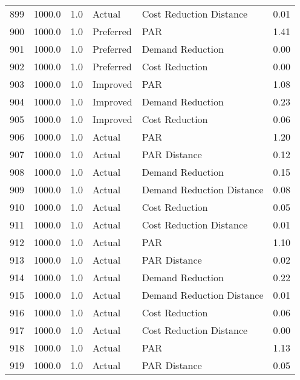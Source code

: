 \begin{longtable}{lrrllr}
899  &       1000.0 &     1.0 &         Actual &    Cost Reduction Distance &   0.01 \\
900  &       1000.0 &     1.0 &      Preferred &                        PAR &   1.41 \\
901  &       1000.0 &     1.0 &      Preferred &           Demand Reduction &   0.00 \\
902  &       1000.0 &     1.0 &      Preferred &             Cost Reduction &   0.00 \\
903  &       1000.0 &     1.0 &       Improved &                        PAR &   1.08 \\
904  &       1000.0 &     1.0 &       Improved &           Demand Reduction &   0.23 \\
905  &       1000.0 &     1.0 &       Improved &             Cost Reduction &   0.06 \\
906  &       1000.0 &     1.0 &         Actual &                        PAR &   1.20 \\
907  &       1000.0 &     1.0 &         Actual &               PAR Distance &   0.12 \\
908  &       1000.0 &     1.0 &         Actual &           Demand Reduction &   0.15 \\
909  &       1000.0 &     1.0 &         Actual &  Demand Reduction Distance &   0.08 \\
910  &       1000.0 &     1.0 &         Actual &             Cost Reduction &   0.05 \\
911  &       1000.0 &     1.0 &         Actual &    Cost Reduction Distance &   0.01 \\
912  &       1000.0 &     1.0 &         Actual &                        PAR &   1.10 \\
913  &       1000.0 &     1.0 &         Actual &               PAR Distance &   0.02 \\
914  &       1000.0 &     1.0 &         Actual &           Demand Reduction &   0.22 \\
915  &       1000.0 &     1.0 &         Actual &  Demand Reduction Distance &   0.01 \\
916  &       1000.0 &     1.0 &         Actual &             Cost Reduction &   0.06 \\
917  &       1000.0 &     1.0 &         Actual &    Cost Reduction Distance &   0.00 \\
918  &       1000.0 &     1.0 &         Actual &                        PAR &   1.13 \\
919  &       1000.0 &     1.0 &         Actual &               PAR Distance &   0.05 \\

\end{longtable}
